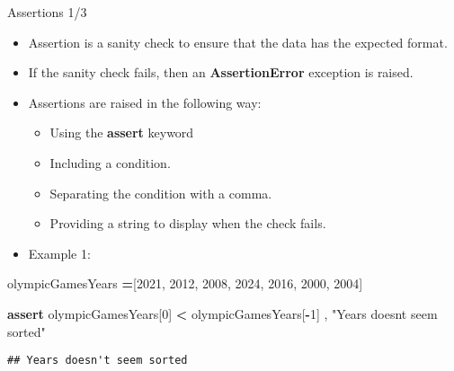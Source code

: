 \documentclass[
  8pt,
  ignorenonframetext,
]{beamer}
\newenvironment{Shaded}{\begin{snugshade}}{\end{snugshade}}
\newcommand{\ControlFlowTok}[1]{\textcolor[rgb]{0.13,0.29,0.53}{\textbf{#1}}}
\newcommand{\DecValTok}[1]{\textcolor[rgb]{0.00,0.00,0.81}{#1}}
\newcommand{\NormalTok}[1]{#1}
\newcommand{\OperatorTok}[1]{\textcolor[rgb]{0.81,0.36,0.00}{\textbf{#1}}}
\newcommand{\StringTok}[1]{\textcolor[rgb]{0.31,0.60,0.02}{#1}}
\providecommand{\tightlist}{%
  \setlength{\itemsep}{0pt}\setlength{\parskip}{0pt}}
\begin{document}
\begin{frame}[fragile]{Assertions 1/3}
\protect\hypertarget{assertions-13}{}
\begin{itemize}
\item
  Assertion is a sanity check to ensure that the data has the expected
  format.
\item
  If the sanity check fails, then an \textbf{AssertionError} exception
  is raised.
\item
  Assertions are raised in the following way:

  \begin{itemize}
  \tightlist
  \item
    Using the \textbf{assert} keyword
  \item
    Including a condition.
  \item
    Separating the condition with a comma.
  \item
    Providing a string to display when the check fails.
  \end{itemize}
\item
  Example 1:
\end{itemize}

\begin{Shaded}
\begin{Highlighting}[]
\NormalTok{olympicGamesYears }\OperatorTok{=}\NormalTok{[}\DecValTok{2021}\NormalTok{, }\DecValTok{2012}\NormalTok{, }\DecValTok{2008}\NormalTok{, }\DecValTok{2024}\NormalTok{, }\DecValTok{2016}\NormalTok{, }\DecValTok{2000}\NormalTok{, }\DecValTok{2004}\NormalTok{]}

\ControlFlowTok{assert}\NormalTok{ olympicGamesYears[}\DecValTok{0}\NormalTok{] }\OperatorTok{\textless{}}\NormalTok{ olympicGamesYears[}\OperatorTok{{-}}\DecValTok{1}\NormalTok{] , }\StringTok{"Years doesn\textquotesingle{}t seem sorted"}
\end{Highlighting}
\end{Shaded}

\begin{verbatim}
## Years doesn't seem sorted
\end{verbatim}
\end{frame}
\end{document}
